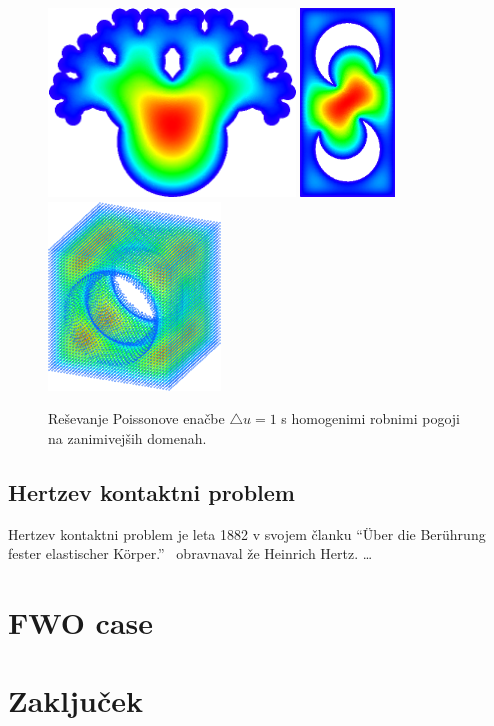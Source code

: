 \documentclass[a4paper,twoside]{article}
\theoremstyle{definition} %
\theoremstyle{plain} %
\numberwithin{equation}{section}
\begin{document}
\begin{figure}[h]
  \centering
  \includegraphics[height=5cm]{images/poisson_weird1.png}
  \hspace{10pt}
  \includegraphics[height=5cm]{images/poisson_weird2.png}
  \hspace{10pt}
  \includegraphics[height=5cm]{images/poisson_weird3.png}
  \caption{Reševanje Poissonove enačbe $\triangle u = 1$ s homogenimi robnimi pogoji na
  zanimivejših domenah.}
  \label{fig:poisson-square-weird}
\end{figure}

\subsection{Hertzev kontaktni problem}
Hertzev kontaktni problem je leta 1882 v svojem članku ``{\"U}ber die Ber{\"u}hrung fester
elastischer K{\"o}rper.''~\cite{hertz1882beruhrung} obravnaval že Heinrich Hertz.
 \dots

\section{FWO case}

\section{Zaključek}

\clearpage


\end{document}

